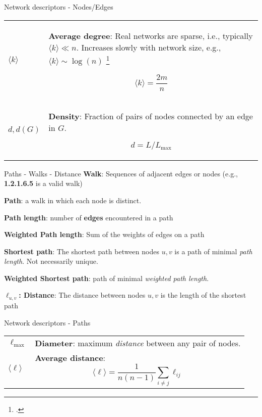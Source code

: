 \begin{textbox}{Network descriptors - Nodes/Edges}
    \begin{tabular}{p{}|p{}}\scriptsize
        $\langle k \rangle$ & \textbf{Average degree}:
        Real networks are sparse, i.e., typically $\langle k \rangle \ll n$. Increases slowly with network size, e.g., $\langle k \rangle \sim \log(n)$ \footcite{leskovec2005graphs}

        \[\langle k \rangle=\frac{2m}{n}\]                                                              \\

        $d,d(G)$            & \textbf{Density}: Fraction of pairs of nodes connected by an edge in $G$.

        \[d=L/L_{\max}
        \]                                                                                              \\
    \end{tabular}
\end{textbox}


\begin{textbox}{Paths - Walks - Distance}
    \textbf{Walk}: Sequences of adjacent edges or nodes (e.g., \textbf{1.2.1.6.5} is a valid walk)

    \textbf{Path}: a walk in which each node is distinct.

    \textbf{Path length}: number of \textbf{edges} encountered in a path

    \textbf{Weighted Path length}: Sum of the weights of edges on a path

    \textbf{Shortest path}: The shortest path between nodes $u,v$ is a path of minimal \textit{path length}. Not necessarily unique.

    \textbf{Weighted Shortest path}: path of minimal \textit{weighted path length}.

    \textbf{$\ell_{u,v}$: Distance}: The distance between nodes $u,v$ is the length of the shortest path
\end{textbox}


\begin{textbox}{Network descriptors - Paths}
    \begin{tabular}{p{}|p{}}\scriptsize
        $\ell_{\max}$          & \textbf{Diameter}: maximum \textit{distance} between any pair of nodes. \\

        $\langle \ell \rangle$ & \textbf{Average distance}:
        \[
            \langle \ell \rangle = \frac{1}{n(n-1)}\sum_{i\neq j} \ell_{ij}
        \]                                                                                               \\
    \end{tabular}
\end{textbox}


